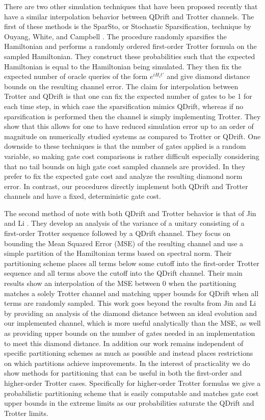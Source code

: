 There are two other simulation techniques that have been proposed recently that have a similar interpolation behavior between QDrift and Trotter channels. The first of these methods is the SparSto, or Stochastic Sparsification, technique by Ouyang, White, and Campbell \cite{sparsto}. The procedure \cite{sparsto} randomly sparsifies the Hamiltonian and performs a randomly ordered first-order Trotter formula on the sampled Hamiltonian. They construct these probabilities such that the expected Hamiltonian is equal to the Hamiltonian being simulated. They then fix the expected number of oracle queries of the form $e^{i H_i t'}$ and give diamond distance bounds on the resulting channel error. The claim for interpolation between Trotter and QDrift is that one can fix the expected number of gates to be 1 for each time step, in which case the sparsification mimics QDrift, whereas if no sparsification is performed then the channel is simply implementing Trotter. They show that this allows for one to have reduced simulation error up to an order of magnitude on numerically studied systems as compared to Trotter or QDrift. One downside to these techniques is that the number of gates applied is a random variable, so making gate cost comparisons is rather difficult especially considering that no tail bounds on high gate cost sampled channels are provided. In \cite{sparsto} they prefer to fix the expected gate cost and analyze the resulting diamond norm error. In contrast, our procedures directly implement both QDrift and Trotter channels and have a fixed, deterministic gate cost.

The second method of note with both QDrift and Trotter behavior is that of Jin and Li \cite{jin2021partially}. They develop an analysis of the variance of a unitary consisting of a first-order Trotter sequence followed by a QDrift channel. They focus on bounding the Mean Squared Error (MSE) of the resulting channel and use a simple partition of the Hamiltonian terms based on spectral norm. Their partitioning scheme places all terms below some cutoff into the first-order Trotter sequence and all terms above the cutoff into the QDrift channel. Their main results show an interpolation of the MSE between 0 when the partitioning matches a solely Trotter channel and matching upper bounds for QDrift when all terms are randomly sampled. This work goes beyond the results from Jin and Li by providing an analysis of the diamond distance between an ideal evolution and our implemented channel, which is more useful analytically than the MSE, as well as providing upper bounds on the number of gates needed in an implementation to meet this diamond distance. In addition our work remains independent of specific partitioning schemes as much as possible and instead places restrictions on which partitions achieve improvements. In the interest of practicality we do show methods for partitioning that can be useful in both the first-order and higher-order Trotter cases. Specifically for higher-order Trotter formulas we give a probabilistic partitioning scheme that is easily computable and matches gate cost upper bounds in the extreme limits as our probabilities saturate the QDrift and Trotter limits. 

